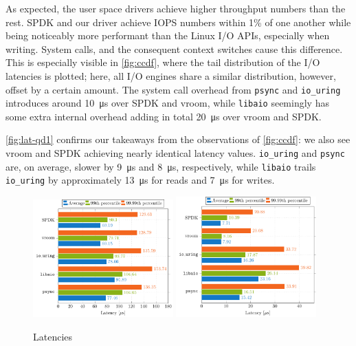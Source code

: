 As expected, the user space drivers achieve higher throughput numbers than the rest. SPDK and our driver achieve IOPS numbers within 1\% of one another while being noticeably more performant than the Linux I/O APIs, especially when writing. System calls, and the consequent context switches cause this difference. This is especially visible in \autoref{fig:ccdf}, where the tail distribution of the I/O latencies is plotted; here, all I/O engines share a similar distribution, however, offset by a certain amount. The system call overhead from \texttt{psync} and \texttt{io\_uring} introduces around \qty{10}{\micro\second} over SPDK and vroom, while \texttt{libaio} seemingly has some extra internal overhead adding in total \qty{20}{\micro\second} over vroom and SPDK.

\autoref{fig:lat-qd1} confirms our takeaways from the observations of \autoref{fig:ccdf}: we also see vroom and SPDK achieving nearly identical latency values. \texttt{io\_uring} and \texttt{psync} are, on average, slower by \qty{9}{\micro\second} and \qty{8}{\micro\second}, respectively, while \texttt{libaio} trails \texttt{io\_uring} by approximately \qty{13}{\micro\second} for reads and \qty{7}{\micro\second} for writes.

\begin{figure}
  \centering
   {\includegraphics[width=0.48\textwidth]{figures/latency-read-xbar} \label{fig:lat-read}}
   {\includegraphics[width=0.48\textwidth]{figures/latency-write-xbar} \label{fig:lat-write}}
  \caption{Latencies}
  \label{fig:lat-qd1}
\end{figure}
